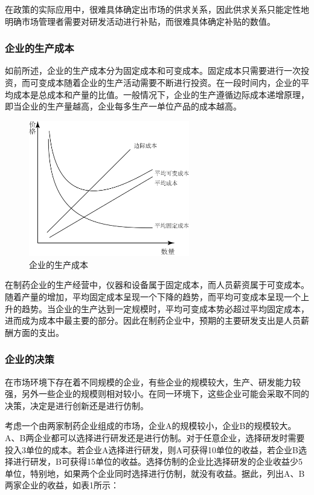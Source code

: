\documentclass[twocolumn,openany]{ctexbook}
\begin{document}
			在政策的实际应用中，很难具体确定出市场的供求关系，因此供求关系只能定性地明确市场管理者需要对研发活动进行补贴，而很难具体确定补贴的数值\citep{RN13}。
			
			\subsubsection{企业的生产成本}
			
			如前所述，企业的生产成本分为固定成本和可变成本。固定成本只需要进行一次投资，而可变成本随着企业的生产活动需要不断进行投资。在一段时间内，企业的平均成本是总成本和产量的比值。一般情况下，企业的生产遵循边际成本递增原理，即当企业的生产量越高，企业每多生产一单位产品的成本越高。
			
			\begin{figure}[ht]
				\centering
				\includegraphics[width=7cm]{fig7.png} %
				\caption{企业的生产成本}
				\label{fig:fig7}
			\end{figure}
			
			在制药企业的生产经营中，仪器和设备属于固定成本，而人员薪资属于可变成本。随着产量的增加，平均固定成本呈现一个下降的趋势，而平均可变成本呈现一个上升的趋势。当企业的生产达到一定规模时，平均可变成本势必超过平均固定成本，进而成为成本中最主要的部分。因此在制药企业中，预期的主要研发支出是人员薪酬方面的支出。
			
			\subsubsection{企业的决策}
			
			在市场环境下存在着不同规模的企业，有些企业的规模较大，生产、研发能力较强，另外一些企业的规模则相对较小。在同一环境下，这些企业可能会采取不同的决策，决定是进行创新还是进行仿制。
			
			考虑一个由两家制药企业组成的市场，企业A的规模较小，企业B的规模较大。A、B两企业都可以选择进行研发还是进行仿制。对于任意企业，选择研发时需要投入3单位的成本。若企业A选择进行研发，则A可获得10单位的收益，若企业B选择进行研发，B可获得15单位的收益。选择仿制的企业比选择研发的企业收益少5单位，特别地，如果两个企业同时选择进行仿制，就没有收益。据此，列出A、B两家企业的收益，如表1所示：
			
\end{document}
